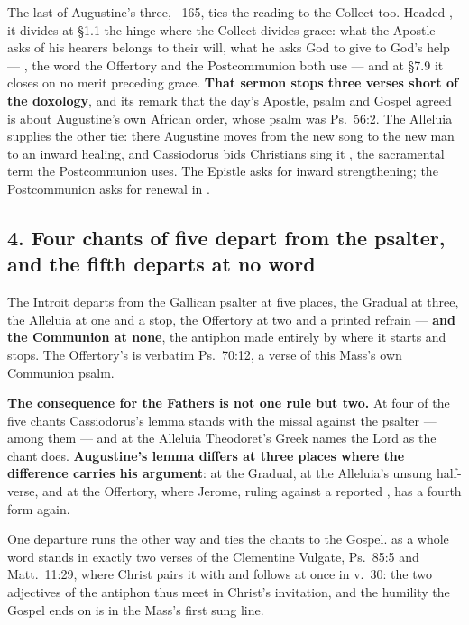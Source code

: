 The last of Augustine's three, ~165, ties the reading to the Collect
too. Headed , it
divides at \S1.1 the hinge where the Collect divides grace: what the Apostle
asks of his hearers belongs to their will, what he asks God to give to God's
help --- , the word the Offertory and the Postcommunion both use
--- and at \S7.9 it closes on no merit preceding grace. \textbf{That sermon
stops three verses short of the doxology}, and its remark that the day's
Apostle, psalm and Gospel agreed is about Augustine's own African order, whose
psalm was Ps.~56:2. The Alleluia supplies the other tie: there Augustine moves
from the new song to the new man to an inward healing, and Cassiodorus bids
Christians sing it , the
sacramental term the Postcommunion uses. The Epistle asks for inward
strengthening; the Postcommunion asks for renewal in .

\subsection*{4. Four chants of five depart from the psalter, and the fifth departs at no word}

The Introit departs from the Gallican psalter at five places, the Gradual at
three, the Alleluia at one and a stop, the Offertory at two and a printed
refrain --- \textbf{and the Communion at none}, the antiphon made entirely by
where it starts and stops. The Offertory's  is
verbatim Ps.~70:12, a verse of this Mass's own Communion psalm.

\textbf{The consequence for the Fathers is not one rule but two.} At four of the
five chants Cassiodorus's lemma stands with the missal against the psalter ---
 among them --- and at the Alleluia
Theodoret's Greek names the Lord as the chant does. \textbf{Augustine's lemma differs at
three places where the difference carries his argument}: 
at the Gradual,  at the Alleluia's unsung
half-verse, and  at the Offertory, where
Jerome, ruling against a reported , has a fourth form again.

One departure runs the other way and ties the chants to the Gospel.
 as a whole word stands in exactly two verses of the Clementine
Vulgate, Ps.~85:5 and Matt.~11:29, where Christ pairs it with  and  follows at once in v.~30:
the two adjectives of the antiphon thus meet in Christ's invitation, and the
humility the Gospel ends on is in the Mass's first sung line.

